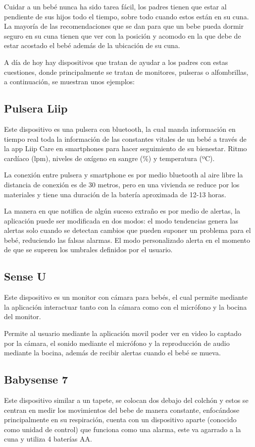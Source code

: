 Cuidar a un bebé nunca ha sido tarea fácil, los padres tienen que estar al pendiente de sus hijos todo el tiempo, sobre todo cuando estos están en su cuna. La mayoría de las recomendaciones que se dan para que un bebe pueda dormir seguro en su cuna tienen que ver con la posición y acomodo en la que debe de estar acostado el bebé además de la ubicación de su cuna.

A día de hoy hay dispositivos que tratan de ayudar a los padres con estas cuestiones, donde principalmente se tratan de monitores, pulseras o alfombrillas, a continuación, se muestran unos ejemplos:

\subsection{Pulsera Liip}
Este dispositivo es una pulsera con bluetooth, la cual manda información en tiempo real toda la información de las constantes vitales de un bebé a través de la app Liip Care en smartphones para hacer seguimiento de su bienestar. Ritmo cardíaco (lpm), niveles de oxígeno en sangre (\%) y temperatura (ºC).

La conexión entre pulsera y smartphone es por medio bluetooth al aire libre la distancia de conexión es de 30 metros, pero en una vivienda se reduce por los materiales y tiene una duración de la batería aproximada de 12-13 horas.

La manera en que notifica de algún suceso extraño es por medio de alertas, la aplicación puede ser modificada en dos modos: el modo tendencias genera las alertas solo cuando se detectan cambios que pueden suponer un problema para el bebé, reduciendo las falsas alarmas. El modo personalizado alerta en el momento de que se superen los umbrales definidos por el usuario.

\subsection{Sense U}
Este dispositivo es un monitor con cámara para bebés, el cual permite mediante la aplicación interactuar tanto con la cámara como con el micrófono y la bocina del monitor.

Permite al usuario mediante la aplicación movil poder ver en video lo captado por la cámara, el sonido mediante el micrófono y la reproducción de audio mediante la bocina, además de recibir alertas cuando el bebé se mueva.

\subsection{Babysense 7}
Este dispositivo similar a un tapete, se colocan dos debajo del colchón y estos se centran en medir los movimientos del bebe de manera constante, enfocándose principalmente en su respiración, cuenta con un dispositivo aparte (conocido como unidad de control) que funciona como una alarma, este va agarrado a la cuna y utiliza 4 baterías AA.

